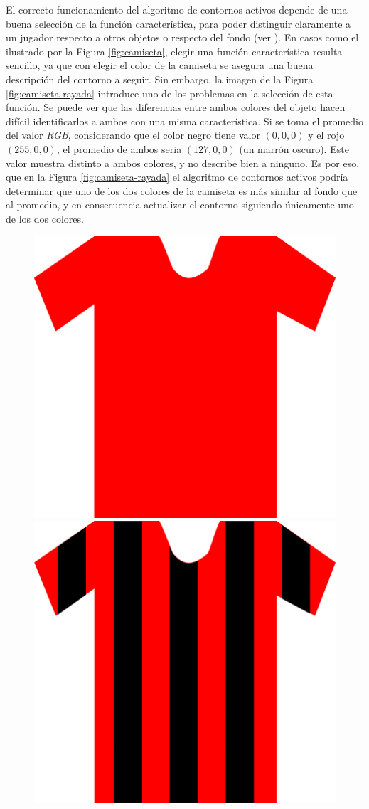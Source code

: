 El correcto funcionamiento del algoritmo de contornos activos depende de una
buena selección de la función característica, para poder distinguir claramente
a un jugador respecto a otros objetos o respecto del fondo (ver
\cite{fast-level-set}). En casos como el ilustrado por la Figura
\ref{fig:camiseta}, elegir una función característica resulta sencillo, ya que
con elegir el color de la camiseta se asegura una buena descripción del
contorno a seguir. Sin embargo, la imagen de la Figura
\ref{fig:camiseta-rayada} introduce uno de los problemas en la selección de
esta función. Se puede ver que las diferencias entre ambos colores del objeto
hacen difícil identificarlos a ambos con una misma característica. Si se toma
el promedio del valor \textit{RGB}, considerando que el color negro tiene valor
$(0, 0, 0)$ y el rojo $(255, 0, 0)$, el promedio de ambos seria $(127, 0, 0)$
(un marrón oscuro). Este valor muestra distinto a ambos colores, y no describe
bien a ninguno. Es por eso, que en la Figura \ref{fig:camiseta-rayada} el 
algoritmo de contornos activos podría determinar que uno de los dos colores de
la camiseta es más similar al fondo que al promedio, y en consecuencia
actualizar el contorno siguiendo únicamente uno de los dos colores.

\begin{figure}[H]
    \centering
    \begin{minipage}[t]{.5\textwidth}
        \centering
        \includegraphics[width=.4\linewidth]{./images/rect2995.png}
    \end{minipage}%
    \begin{minipage}[t]{.5\textwidth}
        \centering
        \includegraphics[width=.4\linewidth]{./images/rect2996.png}
    \end{minipage}
\end{figure}

